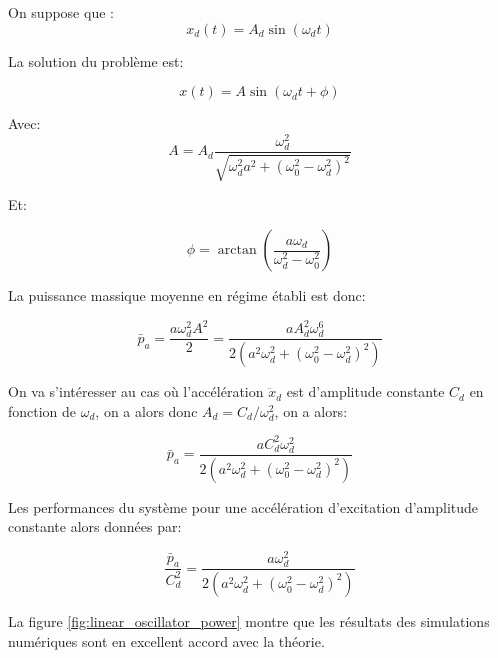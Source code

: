 \documentclass[a4paper,11pt,twoside]{article}
\begin{document}
On suppose que :
$$
x_d(t) = A_d \sin(\omega_d t)
$$

La solution du problème est:

\begin{equation}
x(t) = A \sin(\omega_d t + \phi) 
\end{equation}

Avec:
\begin{equation}
A = A_d\dfrac{\omega_d^2 }{\sqrt{\omega_d^2 a^2 + \left( \omega_0^2 - \omega_d^2\right)^2 } } 
\end{equation}

Et:

\begin{equation}
\phi = \arctan \left(\dfrac{a\omega_d}{\omega_d^2 - \omega_0^2} \right )
\end{equation}

La puissance massique moyenne en régime établi est donc:

\begin{equation}
\bar p_a = \frac{a\omega_d^2 A^2}{2} =   \dfrac{ a A_d^2 \omega_d^6}{2\left(a^2\omega_d^2 + \left( \omega_0^2 - \omega_d^2\right)^2 \right) } 
\end{equation}

On va s'intéresser au cas où l'accélération $\ddot{x}_d$ est d'amplitude constante $C_d$ en fonction de $\omega_d$, on a alors donc $A_d = C_d / \omega_d^2$, on a alors:

\begin{equation}
\bar p_a = \dfrac{ a C_d^2 \omega_d^2}{2\left(a^2\omega_d^2 + \left( \omega_0^2 - \omega_d^2\right)^2 \right) } 
\end{equation}

Les performances du système pour une accélération d'excitation d'amplitude constante alors données par:

\begin{equation}
\dfrac{\bar p_a}{C_d^2} = \dfrac{ a \omega_d^2}{2\left(a^2\omega_d^2 + \left( \omega_0^2 - \omega_d^2\right)^2 \right) } 
\end{equation}

La figure \ref{fig:linear_oscillator_power} montre que les résultats des simulations numériques sont en excellent accord avec la théorie.
\end{document}
